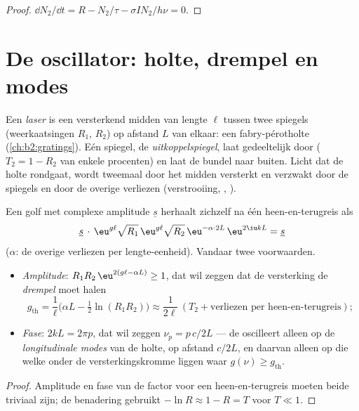 \begin{proof}
$\dd N_2/\dd t = R - N_2/\tau - \sigma I N_2/h\nu = 0$.
\end{proof}

\section{De oscillator: holte, drempel en modes}

\begin{definition}[Laserholte]\label{def:b2:laser:cavity}
Een \emph{laser} is een versterkend midden van lengte $\ell$
tussen twee spiegels (weerkaatsingen $R_1$, $R_2$) op afstand $L$
van elkaar: een fabry-pérotholte (\cref{ch:b2:gratings}). Eén spiegel, de
\emph{uitkoppelspiegel}, laat gedeeltelijk door ($T_2 = 1 - R_2$ van enkele
procenten) en laat de bundel naar buiten. Licht dat de holte rondgaat, wordt
tweemaal door het midden versterkt en verzwakt door de spiegels en door de
overige verliezen (verstrooiing, , ).
\end{definition}

\begin{theorem}[Oscillatievoorwaarde]\label{thm:b2:laser:threshold}
Een golf met complexe amplitude $\underline s$ herhaalt zichzelf na één
heen-en-terugreis als
\[
\underline s\,\cdot\, \eu^{g\ell}\sqrt{R_1}\,\eu^{g\ell}\sqrt{R_2}\,
\eu^{-\alpha\cdot 2L}\,\eu^{2\iu kL} = \underline s
\]
($\alpha$: de overige verliezen per lengte-eenheid). Vandaar twee voorwaarden.
\begin{itemize}
\item \emph{Amplitude}: $R_1R_2\,\eu^{2(g\ell - \alpha L)} \ge 1$, dat wil
        zeggen dat de
      versterking de \emph{drempel} moet halen
      \[
      g_{\text{th}} = \frac{1}{\ell}\Big(\alpha L - \tfrac12\ln(R_1R_2)\Big)
      \approx \frac{1}{2\ell}\,(T_2 + \text{verliezen per heen-en-terugreis}) ;
      \]
\item \emph{Fase}: $2kL = 2\pi p$, dat wil zeggen $\nu_p = p\,c/2L$ --- de 
      oscilleert alleen op de \emph{longitudinale modes} van de holte, op afstand $c/2L$, en daarvan alleen op
      die welke onder de versterkingskromme liggen waar $g(\nu) \ge g_{\text{th}}$.
\end{itemize}
\end{theorem}

\begin{proof}
Amplitude en fase van de factor voor een heen-en-terugreis moeten beide
triviaal zijn; de
benadering gebruikt $-\ln R \approx 1 - R = T$ voor $T \ll 1$.
\end{proof}

